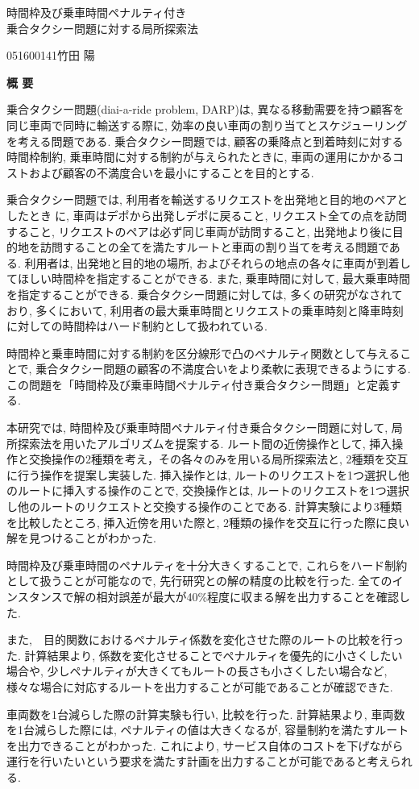 \begin{center}
{\LARGE 時間枠及び乗車時間ペナルティ付き\\乗合タクシー問題に対する局所探索法}\\[0.5cm]
\end{center}
\hfill
{\large 051600141\qquad 竹田 陽}\\[0.5cm]
\begin{center}
{\Large \bf 概 要}\\
\end{center}


乗合タクシー問題(diai-a-ride problem, DARP)は, 異なる移動需要を持つ顧客を同じ車両で同時に輸送する際に, 効率の良い車両の割り当てとスケジューリングを考える問題である. 乗合タクシー問題では, 顧客の乗降点と到着時刻に対する時間枠制約, 乗車時間に対する制約が与えられたときに, 車両の運用にかかるコストおよび顧客の不満度合いを最小にすることを目的とする.

乗合タクシー問題では, 利用者を輸送するリクエストを出発地と目的地のペアとしたときに, 車両はデポから出発しデポに戻ること, リクエスト全ての点を訪問すること, リクエストのペアは必ず同じ車両が訪問すること, 出発地より後に目的地を訪問することの全てを満たすルートと車両の割り当てを考える問題である. 利用者は, 出発地と目的地の場所, およびそれらの地点の各々に車両が到着してほしい時間枠を指定することができる.
また, 乗車時間に対して, 最大乗車時間を指定することができる.
乗合タクシー問題に対しては, 多くの研究がなされており, 多くにおいて, 利用者の最大乗車時間とリクエストの乗車時刻と降車時刻に対しての時間枠はハード制約として扱われている.

時間枠と乗車時間に対する制約を区分線形で凸のペナルティ関数として与えることで, 乗合タクシー問題の顧客の不満度合いをより柔軟に表現できるようにする. この問題を「時間枠及び乗車時間ペナルティ付き乗合タクシー問題」と定義する.

本研究では, 時間枠及び乗車時間ペナルティ付き乗合タクシー問題に対して, 局所探索法を用いたアルゴリズムを提案する.
ルート間の近傍操作として, 挿入操作と交換操作の2種類を考え，その各々のみを用いる局所探索法と, 2種類を交互に行う操作を提案し実装した.
挿入操作とは, ルートのリクエストを1つ選択し他のルートに挿入する操作のことで, 交換操作とは, ルートのリクエストを1つ選択し他のルートのリクエストと交換する操作のことである.
計算実験により3種類を比較したところ, 挿入近傍を用いた際と, 2種類の操作を交互に行った際に良い解を見つけることがわかった.

時間枠及び乗車時間のペナルティを十分大きくすることで, これらをハード制約として扱うことが可能なので, 先行研究との解の精度の比較を行った. 全てのインスタンスで解の相対誤差が最大が40\%程度に収まる解を出力することを確認した.

また,　目的関数におけるペナルティ係数を変化させた際のルートの比較を行った. 計算結果より, 係数を変化させることでペナルティを優先的に小さくしたい場合や, 少しペナルティが大きくてもルートの長さも小さくしたい場合など, 様々な場合に対応するルートを出力することが可能であることが確認できた.

車両数を1台減らした際の計算実験も行い, 比較を行った. 計算結果より, 車両数を1台減らした際には, ペナルティの値は大きくなるが, 容量制約を満たすルートを出力できることがわかった. これにより, サービス自体のコストを下げながら運行を行いたいという要求を満たす計画を出力することが可能であると考えられる.
